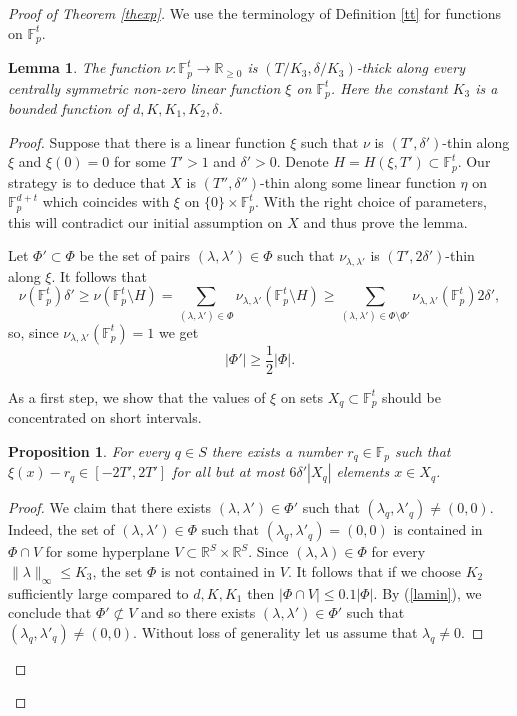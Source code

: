 \documentclass{daj}
\renewcommand{\le}{\leqslant}
\renewcommand{\ge}{\geqslant}
\newcommand{\R}{\mathbb R}
\newcommand{\FF}{\mathbb F}
\newtheorem{lemma}[theorem]{Lemma}
\newtheorem{prop}[theorem]{Proposition}
\theoremstyle{definition}
\theoremstyle{remark}
\theoremstyle{definition}
\theoremstyle{definition}
\begin{document}
\begin{proof}[Proof of Theorem \ref{thexp}]
We use the terminology of Definition \ref{tt} for functions on $\FF_p^t$.
\begin{lemma}\label{nuu}
The function $\nu: \FF_p^t \rightarrow \R_{\ge 0}$ is $(T/K_3, \delta/K_3)$-thick along every centrally symmetric non-zero linear function $\xi$ on $\FF_p^t$. Here the constant $K_3$ is a bounded function of $d, K, K_1, K_2, \delta$.
\end{lemma}

\begin{proof}
Suppose that there is a linear function $\xi$ such that $\nu$ is $(T', \delta')$-thin along $\xi$ and $\xi(0)=0$ for some $T' > 1$ and $\delta' > 0$. Denote $H = H(\xi, T') \subset \FF_p^t$. Our strategy is to deduce that $X$ is $(T'', \delta'')$-thin along some linear function $\eta$ on $\FF_p^{d+t}$ which coincides with $\xi$ on $\{0\}\times \FF_p^t$. With the right choice of parameters, this will contradict our initial assumption on $X$ and thus prove the lemma.

Let $\Phi' \subset \Phi$ be the set of pairs $(\lambda, \lambda') \in \Phi$ such that $\nu_{\lambda, \lambda'}$ is $(T', 2\delta')$-thin along $\xi$. It follows that
$$
\nu(\FF_p^t) \delta'  \ge \nu(\FF_p^t \setminus H) = \sum_{(\lambda, \lambda') \in \Phi} \nu_{\lambda, \lambda'}(\FF_p^t \setminus H) \ge \sum_{(\lambda, \lambda') \in \Phi \setminus \Phi'}  \nu_{\lambda, \lambda'}(\FF_p^t) 2\delta' ,
$$
so, since $\nu_{\lambda, \lambda'}(\FF_p^t) = 1$ we get 
\begin{equation}\label{lamin}
|\Phi'| \ge \frac12 |\Phi|.
\end{equation}

As a first step, we show that the values of $\xi$ on sets $X_q \subset \FF_p^t$ should be concentrated on short intervals. 

\begin{prop}\label{jb}
    For every $q \in S$ there exists a number $r_q \in \FF_p$ such that $\xi(x) - r_q \in [-2T', 2T']$ for all but at most $6\delta' |X_q|$ elements $x \in X_q$.
\end{prop}

\begin{proof}
We claim that there exists $(\lambda, \lambda')\in \Phi'$ such that $(\lambda_q, \lambda'_q) \neq (0, 0)$. Indeed, the set of $(\lambda, \lambda') \in \Phi$ such that $(\lambda_q, \lambda'_q) = (0, 0)$ is contained in $\Phi \cap V$ for some hyperplane $V \subset \R^{S} \times \R^{S}$. Since $(\lambda, \lambda) \in \Phi$ for every $\|\lambda\|_\infty \le K_3$, the set $\Phi$ is not contained in $V$. It follows that if we choose $K_2$ sufficiently large compared to $d, K, K_1$ then $|\Phi \cap V| \le 0.1 |\Phi|$. By (\ref{lamin}), we conclude that $\Phi' \not \subset V$ and so there exists $(\lambda, \lambda')\in \Phi'$ such that $(\lambda_q, \lambda'_q) \neq (0, 0)$. Without loss of generality let us assume that $\lambda_q \neq 0$.
    

\end{proof}
\end{proof}
\end{proof}
\end{document}

